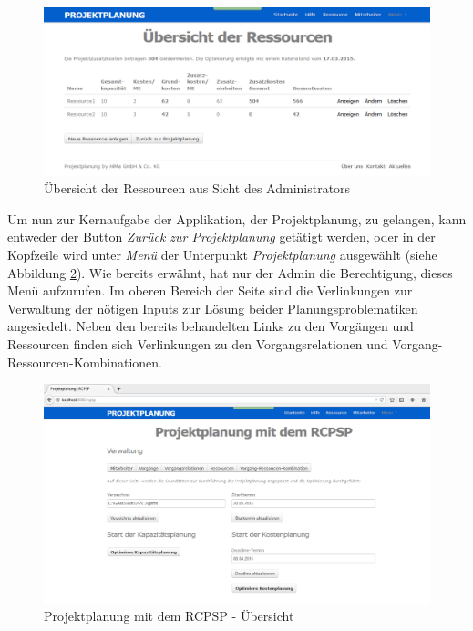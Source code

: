 \documentclass[a4paper,12pt,parskip,bibtotoc,liststotoc]{article}
\begin{document}
\begin{figure}[h!]
  \begin{center}
    \includegraphics[width=120mm]{Bilder/Ressourcen_Admin.png}
    \caption{Übersicht der Ressourcen aus Sicht des Administrators}  \label{ResAd}
  \end{center}
\end{figure}     
  
Um nun zur Kernaufgabe der Applikation, der Projektplanung, zu gelangen, kann entweder der Button \textit{Zurück zur Projektplanung} getätigt werden, oder in der Kopfzeile wird unter \textit{Menü} der Unterpunkt \textit{Projektplanung} ausgewählt (siehe Abbildung \ref{RCPSP}). Wie bereits erwähnt, hat nur der Admin die Berechtigung, dieses Menü aufzurufen. Im oberen Bereich der Seite sind die Verlinkungen zur Verwaltung der nötigen Inputs zur Lösung beider Planungsproblematiken angesiedelt. Neben den bereits behandelten Links zu den Vorgängen und Ressourcen finden sich Verlinkungen zu den Vorgangsrelationen und Vorgang-Ressourcen-Kombinationen.\\ 

\begin{figure}[h!]
  \begin{center}
    \includegraphics[width=120mm]{Bilder/Projektplanung.png}
    \caption{Projektplanung mit dem RCPSP - Übersicht}  \label{RCPSP}
  \end{center}
\end{figure}
\end{document}
